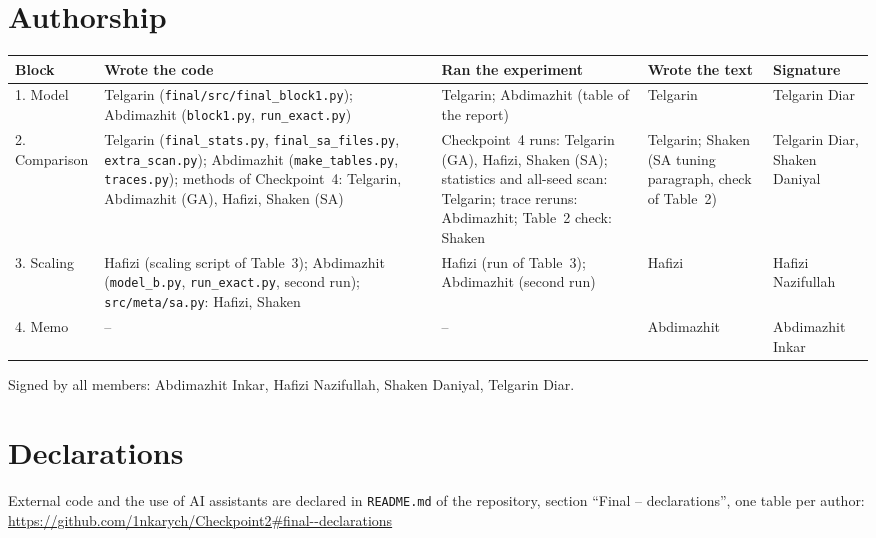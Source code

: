\documentclass[11pt,a4paper]{article}
\begin{document}
\section{Authorship}
{\footnotesize
\begin{tabularx}{\textwidth}{@{}p{1.7cm}>{\raggedright\arraybackslash}X>{\raggedright\arraybackslash}Xp{1.4cm}p{2.4cm}@{}}
\toprule
Block & Wrote the code & Ran the experiment & Wrote the text & Signature\\
\midrule
1. Model & Telgarin (\texttt{final/src/final\_block1.py}); Abdimazhit (\texttt{block1.py}, \texttt{run\_exact.py}) & Telgarin; Abdimazhit (table of the report) & Telgarin & Telgarin Diar\\
2. Comparison & Telgarin (\texttt{final\_stats.py}, \texttt{final\_sa\_files.py}, \texttt{extra\_scan.py}); Abdimazhit (\texttt{make\_tables.py}, \texttt{traces.py}); methods of Checkpoint~4: Telgarin, Abdimazhit (GA), Hafizi, Shaken (SA) & Checkpoint~4 runs: Telgarin (GA), Hafizi, Shaken (SA); statistics and all-seed scan: Telgarin; trace reruns: Abdimazhit; Table~2 check: Shaken & Telgarin; Shaken (SA tuning paragraph, check of Table~2) & Telgarin Diar, Shaken Daniyal\\
3. Scaling & Hafizi (scaling script of Table~3); Abdimazhit (\texttt{model\_b.py}, \texttt{run\_exact.py}, second run); \texttt{src/meta/sa.py}: Hafizi, Shaken & Hafizi (run of Table~3); Abdimazhit (second run) & Hafizi & Hafizi Nazifullah\\
4. Memo & -- & -- & Abdimazhit & Abdimazhit Inkar\\
\bottomrule
\end{tabularx}}

Signed by all members: Abdimazhit Inkar, Hafizi Nazifullah, Shaken Daniyal, Telgarin Diar.

\section{Declarations}
External code and the use of AI assistants are declared in \texttt{README.md} of the repository, section ``Final -- declarations'', one table per author:\\ \url{https://github.com/1nkarych/Checkpoint2\#final--declarations}
\end{document}
